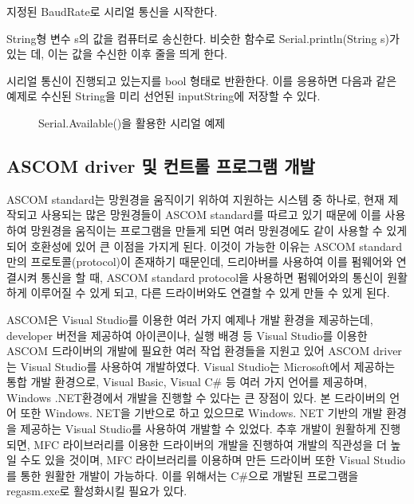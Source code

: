 \begin{description}[font=$\bullet$~\normalfont\scshape\color{red!50!black}]
	\item [Serial.begin(int BaudRate)] 지정된 BaudRate로 시리얼 통신을 시작한다.
	\item [Serial.print(String s)] String형 변수 s의 값을 컴퓨터로 송신한다. 비슷한 함수로 Serial.println(String s)가 있는 데, 이는 값을 수신한 이후 줄을 띄게 한다.
	\item [Serial.available()] 시리얼 통신이 진행되고 있는지를 bool 형태로 반환한다. 이를 응용하면 다음과 같은 예제로 수신된 String을 미리 선언된 inputString에 저장할 수 있다.

\begin{figure}[h]
	\begin{center}
		\caption{Serial.Available()을 활용한 시리얼 예제}
		\label{fig:serialEvent}
	\end{center}
\end{figure}


\subsection{ASCOM driver 및 컨트롤 프로그램 개발}

ASCOM standard는 망원경을 움직이기 위하여 지원하는 시스템 중 하나로, 현재 제작되고 사용되는 많은 망원경들이 ASCOM standard를 따르고 있기 때문에 이를 사용하여 망원경을 움직이는 프로그램을 만들게 되면 여러 망원경에도 같이 사용할 수 있게 되어 호환성에 있어 큰 이점을 가지게 된다. 이것이 가능한 이유는 ASCOM standard 만의 프로토콜(protocol)이 존재하기 때문인데, 드리아버를 사용하여 이를 펌웨어와 연결시켜 통신을 할 때, ASCOM standard protocol을 사용하면 펌웨어와의 통신이 원활하게 이루어질 수 있게 되고, 다른 드라이버와도 연결할 수 있게 만들 수 있게 된다.

ASCOM은 Visual Studio를 이용한 여러 가지 예제나 개발 환경을 제공하는데, developer 버전을 제공하여 아이콘이나, 실행 배경 등 Visual Studio를 이용한 ASCOM 드라이버의 개발에 필요한 여러 작업 환경들을 지원고 있어 ASCOM driver는 Visual Studio를 사용하여 개발하였다. Visual Studio는 Microsoft에서 제공하는 통합 개발 환경으로, Visual Basic, Visual C\# 등 여러 가지 언어를 제공하며, Windows .NET환경에서 개발을 진행할 수 있다는 큰 장점이 있다. 본 드라이버의 언어 또한 Windows. NET을 기반으로 하고 있으므로 Windows. NET 기반의 개발 환경을 제공하는 Visual Studio를 사용하여 개발할 수 있었다. 추후 개발이 원활하게 진행되면, MFC 라이브러리를 이용한 드라이버의 개발을 진행하여 개발의 직관성을 더 높일 수도 있을 것이며, MFC 라이브러리를 이용하며 만든 드라이버 또한 Visual Studio를 통한 원활한 개발이 가능하다. 이를 위해서는 C\#으로 개발된 프로그램을 regasm.exe로 활성화시킬 필요가 있다.


\end{description}
